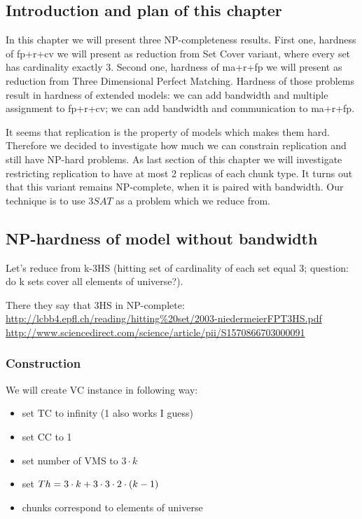 \subsection{Introduction and plan of this chapter}

In this chapter we will present three NP-completeness results. First
one, hardness of fp+r+cv we will present as reduction from Set Cover
variant, where every set has cardinality exactly 3. Second one,
hardness of ma+r+fp we will present as reduction from Three
Dimensional Perfect Matching. Hardness of those problems result in
hardness of extended models: we can add bandwidth and multiple
assignment to fp+r+cv; we can add bandwidth and communication to
ma+r+fp.

It seems that replication is the property of models which makes them
hard. Therefore we decided to investigate how much we can constrain
replication and still have NP-hard problems. As last section of this
chapter we will investigate restricting replication to have at most 2
replicas of each chunk type. It turns out that this variant remains
NP-complete, when it is paired with bandwidth. Our technique is to use
$3SAT$ as a problem which we reduce from.

\subsection{NP-hardness of model without bandwidth}
Let's reduce from k-3HS (hitting set of cardinality of each set equal
3; question: do k sets cover all elements of universe?).

There they say that 3HS in NP-complete:
\url{http://lcbb4.epfl.ch/reading/hitting\%20set/2003-niedermeierFPT3HS.pdf}
\url{http://www.sciencedirect.com/science/article/pii/S1570866703000091}


\subsubsection{Construction}

We will create VC instance in following way:
\begin{itemize}
\item set TC to infinity (1 also works I guess)
\item set CC to 1
\item set number of VMS to $3 \cdot k$
\item set $Th =  3 \cdot k + 3 \cdot 3 \cdot 2 \cdot (k - 1)$
\item chunks correspond to elements of universe
\end{itemize}

